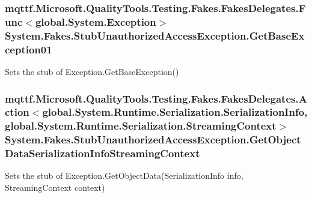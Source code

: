 \hypertarget{class_system_1_1_fakes_1_1_stub_unauthorized_access_exception_ae3c47bccf28e091afadb5f6e4ae089cb}{
\subsubsection[{Get\-Base\-Exception01}]{\setlength{\rightskip}{0pt plus 5cm}mqttf.\-Microsoft.\-Quality\-Tools.\-Testing.\-Fakes.\-Fakes\-Delegates.\-Func$<$global.\-System.\-Exception$>$ System.\-Fakes.\-Stub\-Unauthorized\-Access\-Exception.\-Get\-Base\-Exception01}}\label{class_system_1_1_fakes_1_1_stub_unauthorized_access_exception_ae3c47bccf28e091afadb5f6e4ae089cb}


Sets the stub of Exception.\-Get\-Base\-Exception()

\hypertarget{class_system_1_1_fakes_1_1_stub_unauthorized_access_exception_a53b6541183784ad7f18fc611f9caa050}{
\subsubsection[{Get\-Object\-Data\-Serialization\-Info\-Streaming\-Context}]{\setlength{\rightskip}{0pt plus 5cm}mqttf.\-Microsoft.\-Quality\-Tools.\-Testing.\-Fakes.\-Fakes\-Delegates.\-Action$<$global.\-System.\-Runtime.\-Serialization.\-Serialization\-Info, global.\-System.\-Runtime.\-Serialization.\-Streaming\-Context$>$ System.\-Fakes.\-Stub\-Unauthorized\-Access\-Exception.\-Get\-Object\-Data\-Serialization\-Info\-Streaming\-Context}}\label{class_system_1_1_fakes_1_1_stub_unauthorized_access_exception_a53b6541183784ad7f18fc611f9caa050}


Sets the stub of Exception.\-Get\-Object\-Data(\-Serialization\-Info info, Streaming\-Context context)

